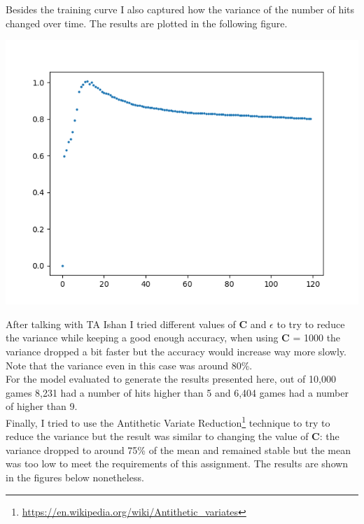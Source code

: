 \documentclass[11pt]{article}
\begin{document}
Besides the training curve I also captured how the variance of the number of hits changed over time. 
The results are plotted in the following figure.

\begin{center}
\includegraphics[scale=1]{part2.1/std.png}
\end{center}

After talking with TA Ishan I tried different values of \textbf{C} and $\epsilon$ to try to reduce the variance while keeping a good enough accuracy, when using \textbf{C} = 1000 the variance dropped a bit faster but the accuracy would increase way more slowly. Note that the variance even in this case was around 80\%. \\

For the model evaluated to generate the results presented here, out of 10,000 games 8,231 had a number of hits higher than 5 and 6,404 games had a number of higher than 9. \\

Finally, I tried to use the Antithetic Variate Reduction\footnote{\url{https://en.wikipedia.org/wiki/Antithetic_variates}} technique to try to reduce the variance but the result was similar to changing the value of \textbf{C}: the variance dropped to around 75\% of the mean and remained stable but the mean was too low to meet the requirements of this assignment. The results are shown in the figures below nonetheless.
\end{document}

